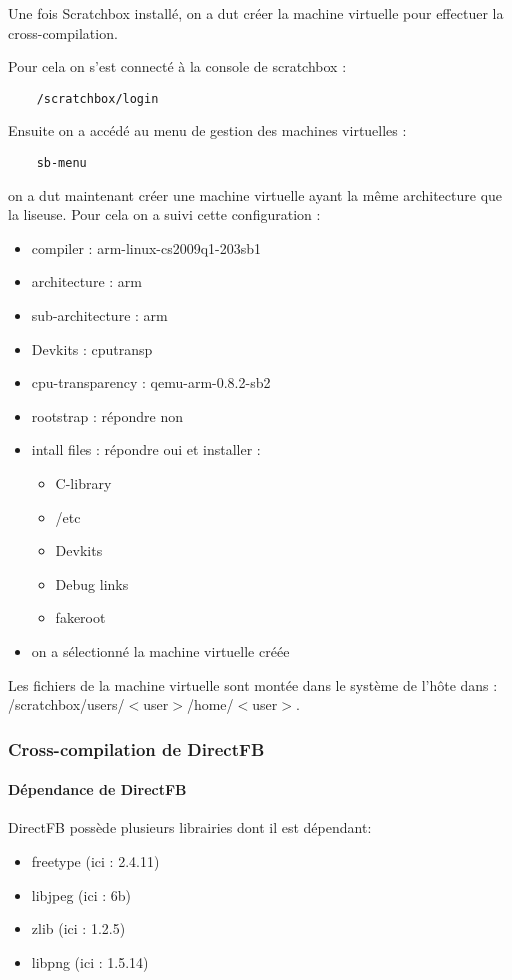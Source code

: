 Une fois Scratchbox installé, on a dut créer la machine virtuelle pour effectuer la cross-compilation.

Pour cela on s'est connecté à la console de scratchbox : 
\begin{lstlisting}
	/scratchbox/login
\end{lstlisting}
Ensuite on a accédé au menu de gestion des machines virtuelles : 
\begin{lstlisting}
	sb-menu
\end{lstlisting}
on a dut maintenant créer une machine virtuelle ayant la même architecture que la liseuse. 
Pour cela on a suivi cette configuration : 
\begin{itemize}
	\item compiler : arm-linux-cs2009q1-203sb1
	\item architecture : arm
	\item sub-architecture : arm
	\item Devkits : cputransp
	\item cpu-transparency :  qemu-arm-0.8.2-sb2
	\item rootstrap : répondre non
	\item intall files : répondre oui et installer :
		\begin{itemize}
			\item C-library
			\item /etc
			\item Devkits 
			\item Debug links
			\item fakeroot
		\end{itemize}
	\item on a sélectionné la machine virtuelle créée
\end{itemize}

Les fichiers de la machine virtuelle sont montée dans le système de l’hôte dans : 
/scratchbox/users/$<$user$>$/home/$<$user$>$.

\subsubsection{Cross-compilation de DirectFB}

\paragraph{Dépendance de DirectFB}
DirectFB possède plusieurs librairies dont il est dépendant: 
	\begin{itemize}
		\item freetype (ici : 2.4.11)
		\item libjpeg (ici : 6b)
		\item zlib (ici : 1.2.5)
		\item libpng (ici : 1.5.14)
	\end{itemize}

